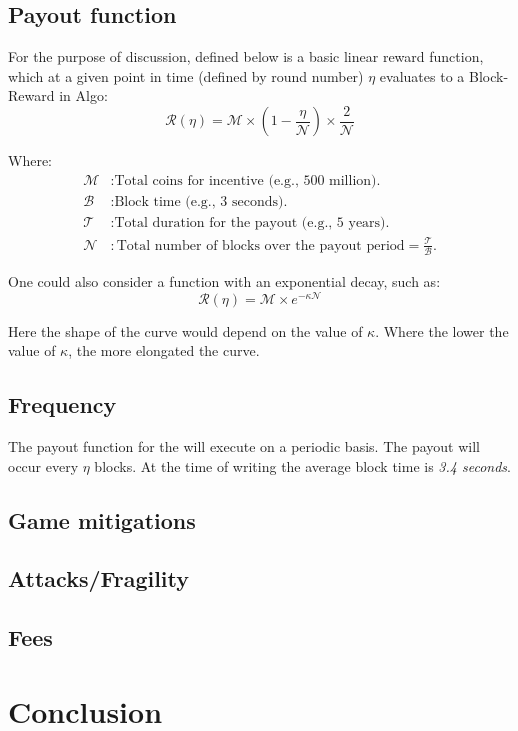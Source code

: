 \documentclass[11pt,a4paper]{article}
\begin{document}
\subsection{Payout function}
For the purpose of discussion, defined below is a basic linear reward function, which at a given point in time (defined 
by round number) $\eta$ evaluates to a \gls{Block-Reward} in Algo:\\

\[
\mathcal{R}(\eta) = \mathcal{M} \times \left( 1 - \frac{\eta}{\mathcal{N}} \right) \times \frac{2}{\mathcal{N}}
\]

Where:
\begin{align*}
\mathcal{M} & : \text{Total coins for incentive (e.g., 500 million).} \\
\mathcal{B} & : \text{Block time (e.g., 3 seconds).} \\
\mathcal{T} & : \text{Total duration for the payout (e.g., 5 years).} \\
\mathcal{N} & : \text{Total number of blocks over the payout period} = \frac{\mathcal{T}}{\mathcal{B}}.
\end{align*}

One could also consider a function with an exponential decay, such as:
\[
\mathcal{R}(\eta) = \mathcal{M} \times e^{-\kappa \mathcal{N}}
\]

Here the shape of the curve would depend on the value of $\kappa$. Where the lower the value of \(\kappa\), the more 
elongated the curve.

\subsection{Frequency}
The payout function for the  will execute on a periodic basis. The payout will occur every 
$\eta$ blocks. At the time of writing the average block time is \emph{3.4 seconds}.

\subsection{Game mitigations}

\subsection{Attacks/Fragility}

\subsection{Fees}

\pagebreak

\section{Conclusion}

\pagebreak

\printglossaries
\end{document}
